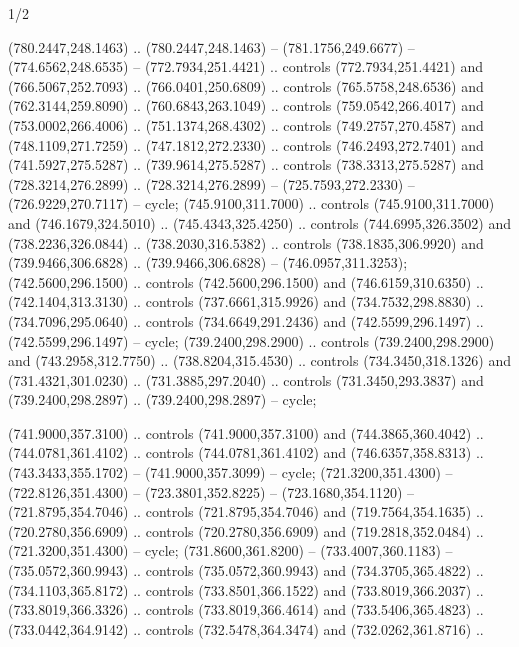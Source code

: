 \begin{flagdescription}{1/2}
\begin{scope}[xshift=0.5\flaglength,yshift=0.5\flagwidth,scale=\flagwidth/759]
\begin{scope}[y=0.8pt, x=0.8pt, yscale=-1,shift={(-720,-480)}]
\begin{scope}[draw=black,fill=c452c25,line width=0.438\lw]
  (780.2447,248.1463) .. (780.2447,248.1463) -- (781.1756,249.6677) --
  (774.6562,248.6535) -- (772.7934,251.4421) .. controls (772.7934,251.4421) and
  (766.5067,252.7093) .. (766.0401,250.6809) .. controls (765.5758,248.6536) and
  (762.3144,259.8090) .. (760.6843,263.1049) .. controls (759.0542,266.4017) and
  (753.0002,266.4006) .. (751.1374,268.4302) .. controls (749.2757,270.4587) and
  (748.1109,271.7259) .. (747.1812,272.2330) .. controls (746.2493,272.7401) and
  (741.5927,275.5287) .. (739.9614,275.5287) .. controls (738.3313,275.5287) and
  (728.3214,276.2899) .. (728.3214,276.2899) -- (725.7593,272.2330) --
  (726.9229,270.7117) -- cycle;
 (745.9100,311.7000) .. controls (745.9100,311.7000) and
  (746.1679,324.5010) .. (745.4343,325.4250) .. controls (744.6995,326.3502) and
  (738.2236,326.0844) .. (738.2030,316.5382) .. controls (738.1835,306.9920) and
  (739.9466,306.6828) .. (739.9466,306.6828) -- (746.0957,311.3253);
 (742.5600,296.1500) .. controls (742.5600,296.1500) and
  (746.6159,310.6350) .. (742.1404,313.3130) .. controls (737.6661,315.9926) and
  (734.7532,298.8830) .. (734.7096,295.0640) .. controls (734.6649,291.2436) and
  (742.5599,296.1497) .. (742.5599,296.1497) -- cycle;
 (739.2400,298.2900) .. controls (739.2400,298.2900) and
  (743.2958,312.7750) .. (738.8204,315.4530) .. controls (734.3450,318.1326) and
  (731.4321,301.0230) .. (731.3885,297.2040) .. controls (731.3450,293.3837) and
  (739.2400,298.2897) .. (739.2400,298.2897) -- cycle;
\end{scope}
\begin{scope}[draw=black,fill=cd9c0b9,line width=0.438\lw]
 (741.9000,357.3100) .. controls (741.9000,357.3100) and
  (744.3865,360.4042) .. (744.0781,361.4102) .. controls (744.0781,361.4102) and
  (746.6357,358.8313) .. (743.3433,355.1702) -- (741.9000,357.3099) -- cycle;
 (721.3200,351.4300) -- (722.8126,351.4300) --
  (723.3801,352.8225) -- (723.1680,354.1120) -- (721.8795,354.7046) .. controls
  (721.8795,354.7046) and (719.7564,354.1635) .. (720.2780,356.6909) .. controls
  (720.2780,356.6909) and (719.2818,352.0484) .. (721.3200,351.4300) -- cycle;
 (731.8600,361.8200) -- (733.4007,360.1183) --
  (735.0572,360.9943) .. controls (735.0572,360.9943) and (734.3705,365.4822) ..
  (734.1103,365.8172) .. controls (733.8501,366.1522) and (733.8019,366.2037) ..
  (733.8019,366.3326) .. controls (733.8019,366.4614) and (733.5406,365.4823) ..
  (733.0442,364.9142) .. controls (732.5478,364.3474) and (732.0262,361.8716) ..

\end{scope}
\end{scope}
\end{scope}
\end{flagdescription}
